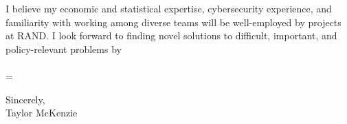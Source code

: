 \documentclass[]{article}
\begin{document}
I believe my economic and statistical expertise, cybersecurity experience, and familiarity with working among diverse teams will be well-employed by projects at RAND. I look forward to finding novel solutions to difficult, important, and policy-relevant problems by \\\\=


\noindent Sincerely,\\

\noindent Taylor McKenzie
\end{document}
